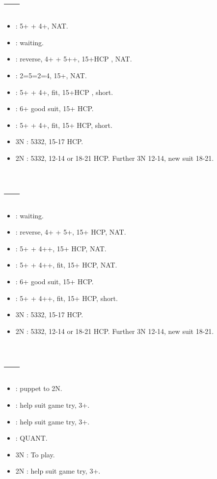 \documentclass[12pt,twoside,a5paper]{report}%
\begin{document}
	\section*{----}
	\begin{itemize}
	\renewcommand{\labelitemi}{}
	\item {} : 5+\he{} + 4+\di{}, NAT.
	\item {} : waiting.
	\item {} : reverse, 4+\sp{} + 5+\he{}+, 15+HCP , NAT.
	\item {} : 2=5=2=4, 15+, NAT.
	\item {} : 5+\he{} + 4+\cl{}, fit, 15+HCP , short\di{}.
	\item {} : 6+\he{} good suit, 15+ HCP.
	\item {} : 5+\he{} + 4+\cl{}, fit, 15+ HCP, short\sp{}.
	\item 3N : 5332, 15-17 HCP.
	\item 2N : 5332, 12-14 or 18-21 HCP. Further 3N 12-14, new suit 18-21.
	\end{itemize}

	\section*{----}
	\begin{itemize}
	\renewcommand{\labelitemi}{}
	\item {} : waiting.
	\item {} : reverse, 4+\sp{} + 5+\he{}, 15+ HCP, NAT.
	\item {} : 5+\he{} + 4+\cl{}+, 15+ HCP, NAT.
	\item {} : 5+\he{} + 4+\di{}+, fit, 15+ HCP, NAT.
	\item {} : 6+\he{} good suit, 15+ HCP.
	\item {} : 5+\he{} + 4+\di{}+, fit, 15+ HCP, short\sp{}.
	\item 3N : 5332, 15-17 HCP.
	\item 2N : 5332, 12-14 or 18-21 HCP. Further 3N 12-14, new suit 18-21.
	\end{itemize}

	\section*{----}
	\begin{itemize}
	\renewcommand{\labelitemi}{} 
	\item {} : puppet to 2N.
	\item {} : help suit game try, 3+\cl{}.
	\item {} : help suit game try, 3+\di{}.
	\item {} : QUANT.
	\item 3N : To play.
	\item 2N : help suit game try, 3+\sp{}. 
	\end{itemize}
\end{document}
